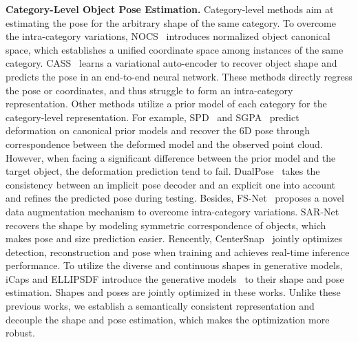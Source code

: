 \documentclass{article}
\begin{document}
\textbf{Category-Level Object Pose Estimation.}
Category-level methods \cite{NOCS, CASS, FS-Net} aim at estimating the pose for the arbitrary shape of the same category. To overcome the intra-category variations, NOCS~\citep{NOCS} introduces normalized object canonical space, which establishes a unified coordinate space among instances of the same category. CASS~\cite{CASS} learns a variational auto-encoder to recover object shape and predicts the pose in an end-to-end neural network. These methods directly regress the pose or coordinates, and thus struggle to form an intra-category representation.
Other methods utilize a prior model of each category for the category-level representation.
For example, SPD~\cite{SPD} and SGPA~\cite{SGPA} predict deformation on canonical prior models and recover the 6D pose through correspondence between the deformed model and the observed point cloud. However, when facing a significant difference between the prior model and the target object, the deformation prediction tend to fail.
DualPose~\cite{DualPose} takes the consistency between an implicit pose decoder and an explicit one into account and refines the predicted pose during testing. Besides, FS-Net~\cite{FS-Net} proposes a novel data augmentation mechanism to overcome intra-category variations. SAR-Net~\cite{lin2022sar} recovers the shape by modeling symmetric correspondence of objects, which makes pose and size prediction easier. Rencently, CenterSnap~\cite{irshad2022centersnap} jointly optimizes
detection, reconstruction and pose when training and achieves real-time inference performance.
To utilize the diverse and continuous shapes in generative models, iCaps\cite{deng2022icaps} and ELLIPSDF\cite{shan2021ellipsdf} introduce the generative models~\cite{park2019deepsdf, DualSDF} to their shape and pose estimation. Shapes and poses are jointly optimized in these works. Unlike these previous works, we establish a semantically consistent representation and decouple the shape and pose estimation, which makes the optimization more robust.
\end{document}
